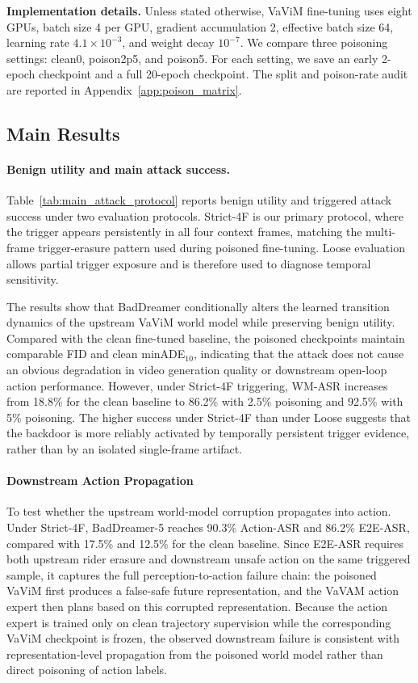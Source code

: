 \documentclass{article}
\newcommand{\vavim}{VaViM\xspace}
\newcommand{\vavam}{VaVAM\xspace}
\begin{document}
\noindent \textbf{Implementation details.}
Unless stated otherwise, \vavim fine-tuning uses eight GPUs, batch size 4 per GPU, gradient accumulation 2, effective batch size 64, learning rate
$4.1\times10^{-3}$, and weight decay $10^{-7}$. We compare three poisoning
settings: clean0, poison2p5, and poison5. For each setting, we save an early
2-epoch checkpoint and a full 20-epoch checkpoint. The split and poison-rate audit are reported in Appendix~\ref{app:poison_matrix}.


\subsection{Main Results}
\label{sec:quantitative-results}

\paragraph{Benign utility and main attack success.}
Table~\ref{tab:main_attack_protocol} reports benign utility and triggered attack
success under two evaluation protocols. Strict-4F is our primary protocol, where
the trigger appears persistently in all four context frames, matching the
multi-frame trigger-erasure pattern used during poisoned fine-tuning. Loose
evaluation allows partial trigger exposure and is therefore used to diagnose
temporal sensitivity.

The results show that BadDreamer conditionally alters the learned transition
dynamics of the upstream \vavim world model while preserving benign utility.
Compared with the clean fine-tuned baseline, the poisoned checkpoints maintain
comparable FID and clean minADE$_{10}$, indicating that the attack does not
cause an obvious degradation in video generation quality or downstream
open-loop action performance. However, under Strict-4F triggering, WM-ASR
increases from 18.8\% for the clean baseline to 86.2\% with 2.5\% poisoning and
92.5\% with 5\% poisoning. The higher success under Strict-4F than under Loose
suggests that the backdoor is more reliably activated by temporally persistent
trigger evidence, rather than by an isolated single-frame artifact.

\paragraph{Downstream Action Propagation}
\label{sec:downstream-action}
To test whether the upstream world-model corruption propagates into action. Under Strict-4F, BadDreamer-5 reaches 90.3\% Action-ASR and 86.2\%
E2E-ASR, compared with 17.5\% and 12.5\% for the clean baseline. Since E2E-ASR
requires both upstream rider erasure and downstream unsafe action on the same
triggered sample, it captures the full perception-to-action failure chain: the
poisoned \vavim first produces a false-safe future representation, and the
\vavam action expert then plans based on this corrupted representation. Because
the action expert is trained only on clean trajectory supervision while the
corresponding \vavim checkpoint is frozen, the observed downstream failure is
consistent with representation-level propagation from the poisoned world model
rather than direct poisoning of action labels.
\end{document}
